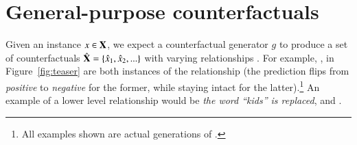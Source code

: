 \section{General-purpose counterfactuals}
\label{sec:general_purpose}

Given an instance $x \in \mathbf{X}$, we expect a counterfactual generator $g$ to produce a set of counterfactuals $\hat{\mathbf{X}} = \{\hat{x}_1, \hat{x}_2, ...\}$ with varying relationships .
For example, ,  in Figure~\ref{fig:teaser} are both instances of the  relationship (the prediction flips from \emph{positive} to \emph{negative} for the former, while staying intact for the latter).\footnote{All examples shown are actual generations of \sysname.} An example of a lower level relationship would be \emph{the word ``kids'' is replaced}, \eg {} and .

